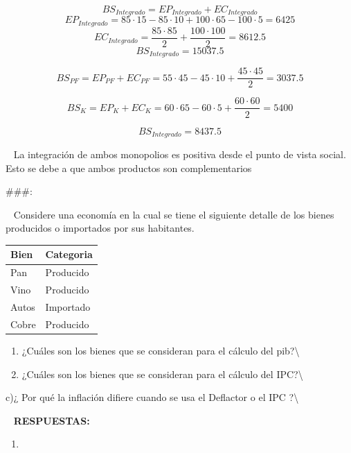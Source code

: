 \documentclass[
  letterpaper,
  DIV=11,
  numbers=noendperiod]{scrreport}
\providecommand{\tightlist}{%
  \setlength{\itemsep}{0pt}\setlength{\parskip}{0pt}}\usepackage{longtable,booktabs,array}
\begin{document}
\[BS_{Integrado}= EP_{Integrado} +EC_{Integrado}  \]
\[EP_{Integrado}= 85\cdot 15 - 85\cdot 10 + 100\cdot 65 -100\cdot 5 = 6425   \]
\[EC_{Integrado}= \frac{85\cdot 85}{2}  +\frac{100\cdot 100}{2}  = 8612.5\]
\[BS_{Integrado}= 15037.5 \]

\[BS_{PF} = EP_{PF} + EC_{PF} =55\cdot45 -45\cdot10 +  \frac{45\cdot 45}{2} = 3037.5\]

\[BS_{K} = EP_{K} + EC_{K} = 60\cdot65 -60\cdot5 +  \frac{60\cdot 60}{2} = 5400\]

\[BS_{Integrado}= 8437.5 \]

~ La integración de ambos monopolios es positiva desde el punto de vista
social. Esto se debe a que ambos productos son complementarios

\#\#\#:

~ Considere una economía en la cual se tiene el siguiente detalle de los
bienes producidos o importados por sus habitantes.

\begin{table}[h]                                                                                                                                                                                        
    \begin{tabular}{|p{30mm}|p{30mm}|}
        \hline
        Bien & Categoria  \\ \hline
        Pan & Producido \\ \hline
        Vino & Producido  \\ \hline
        Autos & Importado  \\ \hline
        Cobre & Producido \\ \hline
    \end{tabular}
\end{table}

\begin{enumerate}
\def\labelenumi{\alph{enumi})}
\item
  ¿Cuáles son los bienes que se consideran para el cálculo del
  pib?\textbackslash{}
\item
  ¿Cuáles son los bienes que se consideran para el cálculo del
  IPC?\textbackslash{}
\end{enumerate}

c)¿ Por qué la inflación difiere cuando se usa el Deflactor o el IPC
?\textbackslash{}

~ \textbf{RESPUESTAS:}

\begin{enumerate}
\def\labelenumi{\alph{enumi})}
\tightlist
\item
\end{enumerate}
\end{document}
